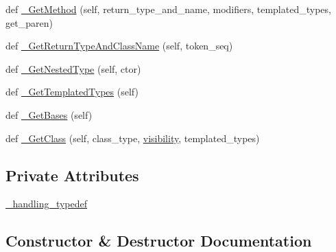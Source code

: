 \begin{DoxyCompactItemize}
\item 
def \mbox{\hyperlink{classcpp_1_1ast_1_1_ast_builder_ad1d43eb0d4bdc6be1a9d7ff86c54bd66}{\+\_\+\+Get\+Method}} (self, return\+\_\+type\+\_\+and\+\_\+name, modifiers, templated\+\_\+types, get\+\_\+paren)
\item 
def \mbox{\hyperlink{classcpp_1_1ast_1_1_ast_builder_abef1c7f48a562a67507bd7ed6f822710}{\+\_\+\+Get\+Return\+Type\+And\+Class\+Name}} (self, token\+\_\+seq)
\item 
def \mbox{\hyperlink{classcpp_1_1ast_1_1_ast_builder_a5d691eeae461945d88601fc2f2dce3cb}{\+\_\+\+Get\+Nested\+Type}} (self, ctor)
\item 
def \mbox{\hyperlink{classcpp_1_1ast_1_1_ast_builder_a07d463f974a3a33de2840fc6965906c3}{\+\_\+\+Get\+Templated\+Types}} (self)
\item 
def \mbox{\hyperlink{classcpp_1_1ast_1_1_ast_builder_a5682851612e95587469f0c6d29d87e01}{\+\_\+\+Get\+Bases}} (self)
\item 
def \mbox{\hyperlink{classcpp_1_1ast_1_1_ast_builder_af5670e1181b5af00bce0acc0dd9d0da7}{\+\_\+\+Get\+Class}} (self, class\+\_\+type, \mbox{\hyperlink{classcpp_1_1ast_1_1_ast_builder_a2f16b19846c405101235432d2666b614}{visibility}}, templated\+\_\+types)
\end{DoxyCompactItemize}
\subsection*{Private Attributes}
\begin{DoxyCompactItemize}
\item 
\mbox{\hyperlink{classcpp_1_1ast_1_1_ast_builder_ac9daa2aa10bc58b5919d20203ff3b813}{\+\_\+handling\+\_\+typedef}}
\end{DoxyCompactItemize}


\subsection{Constructor \& Destructor Documentation}
\mbox{\label{classcpp_1_1ast_1_1_ast_builder_aaf35e2f9d395c99a38e6bb6f9b5dd047}} 

